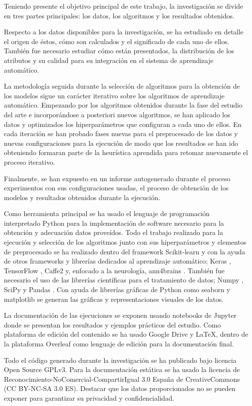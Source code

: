 Teniendo presente el objetivo principal de este trabajo, la investigación se divide en tres partes principales: los datos, los algoritmos y los resultados obtenidos.

Respecto a los datos disponibles para la investigación, se ha estudiado en detalle el origen de éstos, cómo son calculados y el significado de cada uno de ellos. También fue necesario estudiar cómo están presentados, la distribución de los atributos y su calidad para su integración en el sistema de aprendizaje automático. 

La metodología seguida durante la selección de algoritmos para la obtención de los modelos sigue un carácter iterativo sobre los algoritmos de aprendizaje automático. Empezando por los algoritmos obtenidos durante la fase del estudio del arte e incorporándose a posteriori nuevos algoritmos, se han aplicado los datos y optimizados los hiperparámetros que configuran a cada uno de ellos. En cada iteración se han probado fases nuevas para el preprocesado de los datos y nuevas configuraciones para la ejecución de modo que los resultados se han ido obteniendo formaran parte de la heurística aprendida para retomar nuevamente el proceso iterativo.

Finalmente, se han expuesto en un informe autogenerado durante el proceso experimentos con sus configuraciones usadas, el proceso de obtención de los modelos y resultados obtenidos durante la ejecución. 

Como herramienta principal se ha usado el lenguaje de programación interpretado Python para la implementación de software necesario para la obtención y adecuación datos proveídos. Todo el trabajo realizado para la ejecución y selección de los algoritmos junto con sus hiperparámetros y elementos de preprocesado se ha realizado dentro del framework Scikit-learn \cite{Scikit-learn:Documentation} y con la ayuda de otros frameworks y librerías dedicados al aprendizaje automático; Keras \cite{KerasDocumentation}, TensorFlow \cite{TensorFlow}, Caffe2 \cite{Caffe2Framework} y, enfocado a la neurología, ann4brains \cite{Kawahara2017BrainNetCNN:Neurodevelopment}. También fue necesario el uso de las librerías científicas para el tratamiento de datos; Numpy \cite{NumPyNumPy}, SciPy \cite{SciPy.orgSciPy.org} y Pandas \cite{PythonLibrary}. Con ayuda de librerías gráficas de Python como seaborn \cite{Seaborn:Documentation} y matplotlib \cite{InstallationDocumentation} se generan las gráficas y representaciones visuales de los datos.

La documentación de las ejecuciones se exponen usando notebooks de Jupyter \cite{ProjectHome} donde se presentan los resultados y ejemplos prácticos del estudio. Como plataforma de edición del contenido se ha usado Google Drive y  \LaTeX \cite{LaTeXSystem}, dentro de la plataforma Overleaf \cite{Overleaf:Preview} como lenguaje de edición para la documentación final. 

Todo el código generado durante la investigación se ha publicado bajo licencia Open Source GPLv3. Para la documentación estática se ha usado la licencia de Reconocimiento-NoComercial-CompartirIgual 3.0 España de CreativeCommons (CC BY-NC-SA 3.0 ES). Destacar que los datos proporcionados no se pueden exponer para garantizar su privacidad y confidencialidad. 
